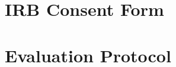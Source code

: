 \begin{appendices}

\section{IRB Consent Form}


%

\section{Evaluation Protocol}
%

\end{appendices}
